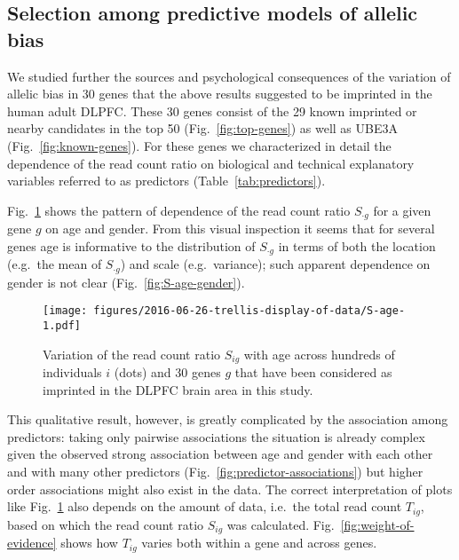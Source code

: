 \documentclass[12pt,letterpaper]{article}
\begin{document}
\subsection{Selection among predictive models of allelic bias}
\label{sec:results-regression}

We studied further the sources and psychological consequences of the variation
of allelic bias in 30 genes that the above results suggested to be imprinted
in the human adult DLPFC.  These 30 genes consist of the 29 known imprinted or
nearby candidates in the top 50 (Fig.~\ref{fig:top-genes}) as well as UBE3A
(Fig.~\ref{fig:known-genes}).  For these genes we characterized in detail the
dependence of the read count ratio on biological and technical explanatory
variables referred to as predictors (Table~\ref{tab:predictors}).

Fig.~\ref{fig:S-age} shows the pattern of dependence of
the read count ratio \(S_{\cdot g}\) for a given gene \(g\) on age and gender.  From
this visual inspection it seems that for several genes age is informative to
the distribution of \(S_{\cdot g}\) in terms of both the location (e.g.~the mean of
\(S_{\cdot g}\)) and scale (e.g.~variance); such apparent dependence on gender is not
clear (Fig.~\ref{fig:S-age-gender}).

\begin{figure}
\begin{center}
\texttt{[image: figures/2016-06-26-trellis-display-of-data/S-age-1.pdf]}
\caption{
Variation of the read count ratio \(S_{ig}\) with age across hundreds of individuals
\(i\) (dots) and 30 genes \(g\) that have been considered as imprinted in the DLPFC
brain area in this study.
}
\label{fig:S-age}
\end{center}
\end{figure}

This qualitative result, however, is greatly complicated by the association
among predictors: taking only pairwise associations the situation is already
complex given the observed strong association between age and gender with each
other and with many other predictors (Fig.~\ref{fig:predictor-associations})
but higher order associations might also exist in the data.
The correct interpretation of plots like Fig.~\ref{fig:S-age} also depends on
the amount of data, i.e.~the total read count \(T_{ig}\), based on which the
read count ratio \(S_{ig}\) was calculated.  Fig.~\ref{fig:weight-of-evidence}
shows how \(T_{ig}\) varies both within a gene and across genes.
\end{document}
